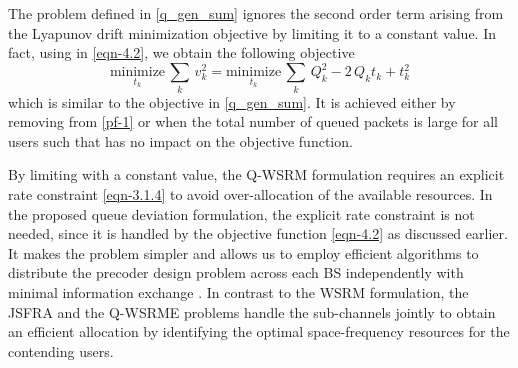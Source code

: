 The problem defined in \eqref{q_gen_sum} ignores the second order term arising from the Lyapunov drift minimization objective by limiting it to a constant value. In fact, using  in \eqref{eqn-4.2}, we obtain the following objective
\begin{equation}\label{pf-1}
\underset{t_k}{\text{minimize}} \, \sum_k \, v_k^2 = \underset{t_k}{\text{minimize}} \, \sum_k \, Q_k^2 - 2 \, Q_k t_k + t_k^2
\end{equation}
which is similar to the objective in \eqref{q_gen_sum}. It is achieved either by removing  from \eqref{pf-1} or when the total number of queued packets is large for all users such that  has no impact on the objective function.

By limiting  with a constant value, the \ac{Q-WSRM} formulation requires an explicit rate constraint \eqref{eqn-3.1.4} to avoid over-allocation of the available resources. In the proposed queue deviation formulation, the explicit rate constraint is not needed, since it is handled by the objective function \eqref{eqn-4.2} as discussed earlier. It makes the problem simpler and allows us to employ efficient algorithms to distribute the precoder design problem across each \ac{BS} independently with minimal information exchange \cite{boyd2011distributed}. In contrast to the \ac{WSRM} formulation, the \ac{JSFRA} and the \ac{Q-WSRME} problems handle the sub-channels jointly to obtain an efficient allocation by identifying the optimal space-frequency resources for the contending users.
